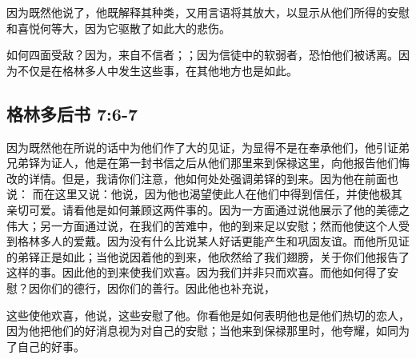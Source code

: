 \par

因为既然他说了，他既解释其种类，又用言语将其放大，以显示从他们所得的安慰和喜悦何等大，因为它驱散了如此大的悲伤。\par

如何四面受敌？因为，来自不信者；；因为信徒中的软弱者，恐怕他们被诱离。因为不仅是在格林多人中发生这些事，在其他地方也是如此。\par


\subsection{格林多后书 7:6-7}

\par

因为既然他在所说的话中为他们作了大的见证，为显得不是在奉承他们，他引证弟兄弟铎为证人，他是在第一封书信之后从他们那里来到保禄这里，向他报告他们悔改的详情。但是，我请你们注意，他如何处处强调弟铎的到来。因为他在前面也说： 而在这里又说：他说，因为他也渴望使此人在他们中得到信任，并使他极其亲切可爱。请看他是如何兼顾这两件事的。因为一方面通过说他展示了他的美德之伟大；另一方面通过说，在我们的苦难中，他的到来足以安慰；然而他使这个人受到格林多人的爱戴。因为没有什么比说某人好话更能产生和巩固友谊。而他所见证的弟铎正是如此；当他说因着他的到来，他欣然给了我们翅膀，关于你们他报告了这样的事。因此他的到来使我们欢喜。因为我们并非只而欢喜。而他如何得了安慰？因你们的德行，因你们的善行。因此他也补充说，\par

这些使他欢喜，他说，这些安慰了他。你看他是如何表明他也是他们热切的恋人，因为他把他们的好消息视为对自己的安慰；当他来到保禄那里时，他夸耀，如同为了自己的好事。\par

